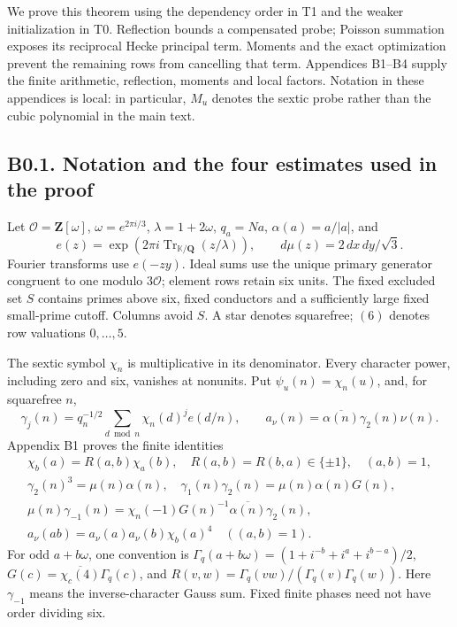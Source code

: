 \documentclass[11pt,a4paper]{article}
\begin{document}
We prove this theorem using the dependency order in T1 and the weaker
initialization in T0. Reflection bounds a compensated probe; Poisson
summation exposes its reciprocal Hecke principal term. Moments and the
exact optimization prevent the remaining rows from cancelling that term.
Appendices B1--B4 supply the finite arithmetic, reflection, moments and
local factors. Notation in these appendices is local: in particular,
\(M_u\) denotes the sextic probe rather than the cubic polynomial in the
main text.

\hypertarget{b0.1.-notation-and-the-four-estimates-used-in-the-proof}{%
\subsection{B0.1. Notation and the four estimates used in the
proof}\label{b0.1.-notation-and-the-four-estimates-used-in-the-proof}}

Let \(\mathcal O=\mathbf Z[\omega]\), \(\omega=e^{2\pi i/3}\),
\(\lambda=1+2\omega\), \(q_a=Na\), \(\alpha(a)=a/|a|\), and \[
e(z)=\exp(2\pi i\operatorname{Tr}_{\mathbb K/\mathbf Q}(z/\lambda)),
\qquad d\mu(z)=2\,dx\,dy/\sqrt3.
\] Fourier transforms use \(e(-zy)\). Ideal sums use the unique primary
generator congruent to one modulo \(3\mathcal O\); element rows retain
six units. The fixed excluded set \(S\) contains primes above six, fixed
conductors and a sufficiently large fixed small-prime cutoff. Columns
avoid \(S\). A star denotes squarefree; \((6)\) denotes row valuations
\(0,\allowbreak{}\ldots,\allowbreak{}5\).

The sextic symbol \(\chi_n\) is multiplicative in its denominator. Every
character power, including zero and six, vanishes at nonunits. Put
\(\psi_u(n)=\chi_n(u)\), and, for squarefree \(n\), \[
\gamma_j(n)=q_n^{-1/2}\sum_{d\bmod n}\chi_n(d)^j e(d/n),
\qquad a_\nu(n)=\overline{\alpha(n)}\gamma_2(n)\nu(n).
\] Appendix B1 proves the finite identities \[
\begin{gathered}
\chi_b(a)=R(a,b)\chi_a(b),\quad R(a,b)=R(b,a)\in\{\pm1\},\quad(a,b)=1,\\
\gamma_2(n)^3=\mu(n)\alpha(n),\quad
\gamma_1(n)\gamma_2(n)=\mu(n)\alpha(n)G(n),\\
\mu(n)\gamma_{-1}(n)=\chi_n(-1)G(n)^{-1}\overline{\alpha(n)}\gamma_2(n),\\
a_\nu(ab)=a_\nu(a)a_\nu(b)\chi_b(a)^4\quad((a,b)=1).
\end{gathered}\tag{B0.2}
\] For odd \(a+b\omega\), one convention is
\(\Gamma_q(a+b\omega)=(1+i^{-b}+i^a+i^{b-a})/2\),
\(G(c)=\overline{\chi_c(4)}\Gamma_q(c)\), and
\(R(v,\allowbreak{}w)=\Gamma_q(vw)/(\Gamma_q(v)\Gamma_q(w))\). Here \(\gamma_{-1}\)
means the inverse-character Gauss sum. Fixed finite phases need not have
order dividing six.
\end{document}
